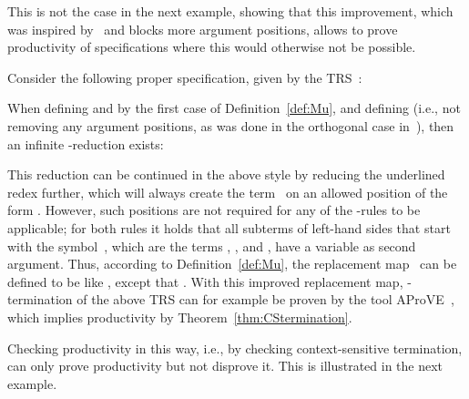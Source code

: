 \documentclass{eptcs}
\begin{document}
This is not the case in the next example, showing that this improvement,
which was inspired by~\cite{EH11} and blocks more argument positions,
allows to prove productivity of specifications where this would otherwise not be
possible.

\begin{example}
\label{ex:BlockingMoreArgs}
Consider the following proper specification, given by the TRS~:


When defining  and
 by the first case of Definition~\ref{def:Mu}, and
defining  (i.e., not removing any argument
positions, as was done in the orthogonal case in~\cite{ZR10}),
then an infinite -reduction exists:


\noindent
This reduction can be continued in the above style by reducing the underlined
redex further, which will always create the term~ on an allowed
position of the form . However, such positions are not required for any
of the -rules to be applicable; for both rules it holds that all
subterms of left-hand sides that start with the symbol~,
which are the terms , , and
,
have a variable as second argument. Thus, according to Definition~\ref{def:Mu},
the replacement map~ can be defined to be like , except that
.
With this improved replacement map, -termination of the above TRS can for
example be proven by the tool AProVE~\cite{AProVE06},
which implies productivity by Theorem~\ref{thm:CStermination}.
\end{example}

Checking productivity in this way, i.e., by checking context-sensitive
termination, can only prove productivity but not disprove it. This is
illustrated in the next example.
\end{document}

